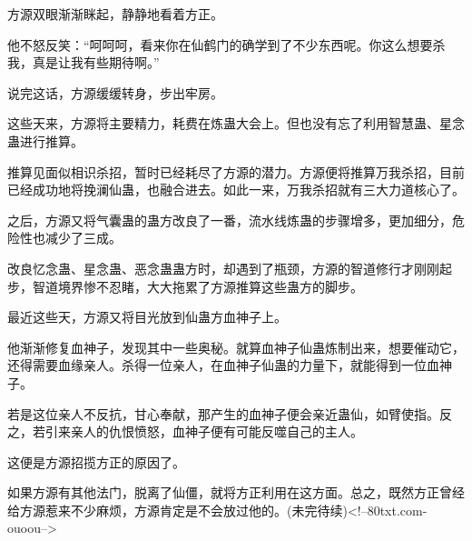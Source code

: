 \begin{this_body}
方源双眼渐渐眯起，静静地看着方正。

他不怒反笑：“呵呵呵，看来你在仙鹤门的确学到了不少东西呢。你这么想要杀我，真是让我有些期待啊。”

说完这话，方源缓缓转身，步出牢房。

这些天来，方源将主要精力，耗费在炼蛊大会上。但也没有忘了利用智慧蛊、星念蛊进行推算。

推算见面似相识杀招，暂时已经耗尽了方源的潜力。方源便将推算万我杀招，目前已经成功地将挽澜仙蛊，也融合进去。如此一来，万我杀招就有三大力道核心了。

之后，方源又将气囊蛊的蛊方改良了一番，流水线炼蛊的步骤增多，更加细分，危险性也减少了三成。

改良忆念蛊、星念蛊、恶念蛊蛊方时，却遇到了瓶颈，方源的智道修行才刚刚起步，智道境界惨不忍睹，大大拖累了方源推算这些蛊方的脚步。

最近这些天，方源又将目光放到仙蛊方血神子上。

他渐渐修复血神子，发现其中一些奥秘。就算血神子仙蛊炼制出来，想要催动它，还得需要血缘亲人。杀得一位亲人，在血神子仙蛊的力量下，就能得到一位血神子。

若是这位亲人不反抗，甘心奉献，那产生的血神子便会亲近蛊仙，如臂使指。反之，若引来亲人的仇恨愤怒，血神子便有可能反噬自己的主人。

这便是方源招揽方正的原因了。

如果方源有其他法门，脱离了仙僵，就将方正利用在这方面。总之，既然方正曾经给方源惹来不少麻烦，方源肯定是不会放过他的。(未完待续)<!--80txt.com-ouoou-->

\end{this_body}

